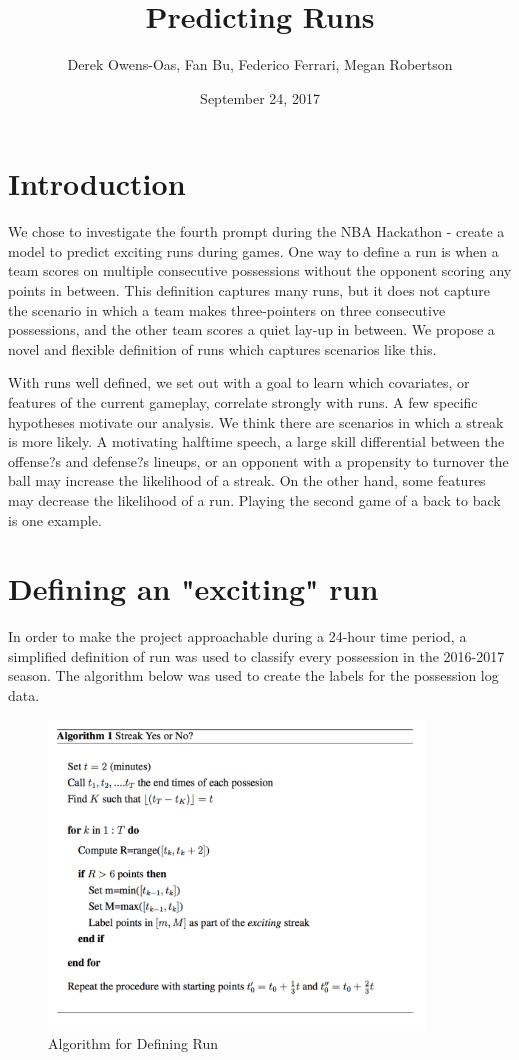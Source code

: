 \documentclass{article}
\title{Predicting Runs}
\author{Derek Owens-Oas, Fan Bu, Federico Ferrari, Megan Robertson}
\date{September 24, 2017}
\begin{document}
\maketitle

\section{Introduction}

We chose to investigate the fourth prompt during the NBA Hackathon - create a model to predict exciting runs during games. One way to define a run is when a team scores on multiple consecutive possessions without the opponent scoring any points in between. This definition captures many runs, but it does not capture the scenario in which a team makes three-pointers on three consecutive possessions, and the other team scores a quiet lay-up in between. We propose a novel and flexible definition of runs which captures scenarios like this. \newline

With runs well defined, we set out with a goal to learn which covariates, or features of the current gameplay, correlate strongly with runs. A few specific hypotheses motivate our analysis. We think there are scenarios in which a streak is more likely. A motivating halftime speech, a large skill differential between the offense?s and defense?s lineups, or an opponent with a propensity to turnover the ball may increase the likelihood of a streak. On the other hand, some features may decrease the likelihood of a run. Playing the second game of a back to back is one example.

\section{Defining an "exciting" run}

In order to make the project approachable during a 24-hour time period, a simplified definition of run was used to classify every possession in the 2016-2017 season. The algorithm below was used to create the labels for the possession log data. 

\begin{figure}[h]
\begin{center}
\includegraphics[width=100mm]{alg_screen.png}
\caption{Algorithm for Defining Run}
\end{center}
\end{figure}
\end{document}
